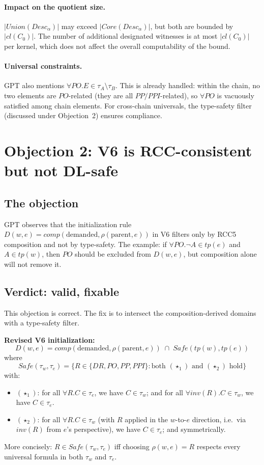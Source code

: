 \documentclass[11pt]{article}
\newcommand{\DR}{\mathit{DR}}
\newcommand{\PO}{\mathit{PO}}
\newcommand{\PP}{\mathit{PP}}
\newcommand{\PPI}{\mathit{PPI}}
\newcommand{\comp}{\mathit{comp}}
\newcommand{\cl}{\mathit{cl}}
\newcommand{\tp}{\mathit{tp}}
\newcommand{\Desc}{\mathit{Desc}}
\newcommand{\Core}{\mathit{Core}}
\newcommand{\inv}{\mathit{inv}}
\begin{document}
\paragraph{Impact on the quotient size.}
$|\mathit{Union}(\Desc_\alpha)|$ may exceed $|\Core(\Desc_\alpha)|$,
but both are bounded by $|\cl(C_0)|$.  The number of additional
designated witnesses is at most $|\cl(C_0)|$ per kernel, which does not
affect the overall computability of the bound.

\paragraph{Universal constraints.}
GPT also mentions $\forall\PO.E \in \tau_A \setminus \tau_B$.  This
is already handled: within the chain, no two elements are $\PO$-related
(they are all $\PP/\PPI$-related), so $\forall\PO$ is vacuously
satisfied among chain elements.  For cross-chain universals, the
type-safety filter (discussed under Objection~2) ensures compliance.

\section{Objection 2: V6 is RCC-consistent but not DL-safe}

\subsection{The objection}

GPT observes that the initialization rule
$D(w, e) = \comp(\text{demanded}, \rho(\text{parent}, e))$ in V6
filters only by RCC5 composition and not by type-safety.  The example:
if $\forall\PO.\neg A \in \tp(e)$ and $A \in \tp(w)$, then $\PO$ should
be excluded from $D(w,e)$, but composition alone will not remove it.

\subsection{Verdict: valid, fixable}

This objection is correct.  The fix is to intersect the composition-derived
domains with a type-safety filter.

\medskip\noindent\textbf{Revised V6 initialization:}
\[
D(w, e) = \comp(\text{demanded}, \rho(\text{parent}, e)) \;\cap\;
\mathit{Safe}(\tp(w), \tp(e))
\]
where
\[
\mathit{Safe}(\tau_w, \tau_e) = \{R \in \{\DR, \PO, \PP, \PPI\} :
\text{both } (\star_1) \text{ and } (\star_2) \text{ hold}\}
\]
with:
\begin{itemize}
\item $(\star_1)$: for all $\forall R.C \in \tau_e$, we have $C \in \tau_w$;
  and for all $\forall\inv(R).C \in \tau_w$, we have $C \in \tau_e$.
\item $(\star_2)$: for all $\forall R.C \in \tau_w$ (with $R$ applied in
  the $w$-to-$e$ direction, i.e.\ via $\inv(R)$ from $e$'s perspective),
  we have $C \in \tau_e$; and symmetrically.
\end{itemize}
More concisely: $R \in \mathit{Safe}(\tau_w, \tau_e)$ iff choosing
$\rho(w, e) = R$ respects every universal formula in both $\tau_w$
and $\tau_e$.
\end{document}
